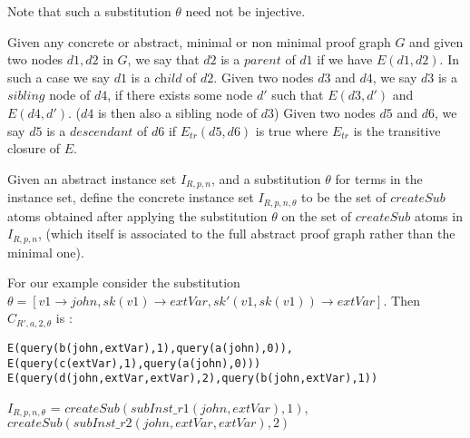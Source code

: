 Note that such a substitution $\theta$ need not be injective.

\begin{definition}
Given any concrete or abstract, minimal or non minimal proof graph $G$ and given two nodes $d1,d2$ in $G$, we say that $d2$ is a $\textit{parent}$ of $d1$ if we have $E(d1,d2)$. In such a case we say $d1$ is a $\textit{child}$ of $d2$. Given two nodes $d3$ and $d4$, we say $d3$ is a $\textit{sibling}$ node of $d4$, if there exists some node $d'$ such that $E(d3,d')$ and $E(d4,d')$. ($d4$ is then also a sibling node of $d3$) Given two nodes $d5$ and $d6$, we say $d5$ is a $\textit{descendant}$ of $d6$ if $E_{tr}(d5,d6)$ is true where $E_{tr}$ is the transitive closure of $E$. 
\end{definition}

\begin{definition}
Given an abstract instance set $I_{R,p,n}$, and a substitution $\theta$ for
terms in the instance set, define the concrete instance set
$I_{R,p,n,\theta}$ to be the set of $createSub$ atoms obtained after applying the
substitution $\theta$ on the set of $createSub$ atoms in $I_{R,p,n}$, (which itself is associated to the full abstract proof graph rather than the minimal one).
\end{definition}

For our example consider the substitution $\theta =[v1\rightarrow john,sk(v1) \rightarrow extVar, sk'(v1,sk(v1))\rightarrow extVar]$. Then $C_{R',a,2,\theta}$ is :
\begin{lstlisting}[frame=none]
E(query(b(john,extVar),1),query(a(john),0)),
E(query(c(extVar),1),query(a(john),0)))
E(query(d(john,extVar,extVar),2),query(b(john,extVar),1))
\end{lstlisting}
$I_{R,p,n,\theta}$ = $createSub(subInst\_r1(john,extVar),1)$,\\ $createSub(subInst\_r2(john,extVar, extVar),2)$

